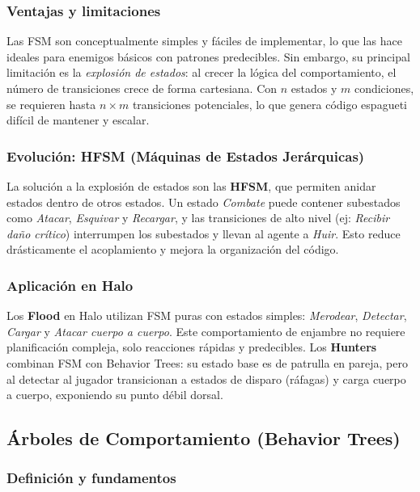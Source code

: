 \documentclass[12pt,letterpaper]{article}
\begin{document}
\subsubsection{Ventajas y limitaciones}

Las FSM son conceptualmente simples y fáciles de implementar, lo que las hace ideales para enemigos básicos con patrones predecibles. Sin embargo, su principal limitación es la \textit{explosión de estados}: al crecer la lógica del comportamiento, el número de transiciones crece de forma cartesiana. Con \(n\) estados y \(m\) condiciones, se requieren hasta \(n \times m\) transiciones potenciales, lo que genera código espagueti difícil de mantener y escalar.

\subsubsection{Evolución: HFSM (Máquinas de Estados Jerárquicas)}

La solución a la explosión de estados son las \textbf{HFSM}, que permiten anidar estados dentro de otros estados. Un estado \textit{Combate} puede contener subestados como \textit{Atacar}, \textit{Esquivar} y \textit{Recargar}, y las transiciones de alto nivel (ej: \textit{Recibir daño crítico}) interrumpen los subestados y llevan al agente a \textit{Huir}. Esto reduce drásticamente el acoplamiento y mejora la organización del código.

\subsubsection{Aplicación en Halo}

Los \textbf{Flood} en Halo utilizan FSM puras con estados simples: \textit{Merodear}, \textit{Detectar}, \textit{Cargar} y \textit{Atacar cuerpo a cuerpo}. Este comportamiento de enjambre no requiere planificación compleja, solo reacciones rápidas y predecibles. Los \textbf{Hunters} combinan FSM con Behavior Trees: su estado base es de patrulla en pareja, pero al detectar al jugador transicionan a estados de disparo (ráfagas) y carga cuerpo a cuerpo, exponiendo su punto débil dorsal.

\subsection{Árboles de Comportamiento (Behavior Trees)}

\subsubsection{Definición y fundamentos}
\end{document}
